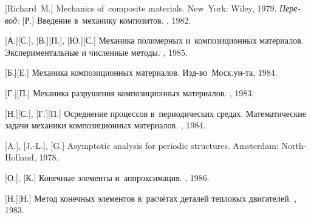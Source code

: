 \begin{thebibliography}{123}
\begin{otherlanguage}{russian}
[Richard~M.] Mechanics of~composite materials. New~York: Wiley, 1979. 
\emph{Перевод:} [Р.] Введение в~механику композитов. \mirpublisher, 1982. 

[А.][С.], [В.][П.], [Ю.][С.] Механика полимерных и~композиционных материалов. Экспериментальные и численные методы. \naukapublisher, 1985. 

[Б.][Е.] Механика композиционных материалов. Изд\hbox{-}во~Моск.\:ун\hbox{-}та, 1984. 

[Г.][П.] Механика разрушения композиционных материалов. \naukapublisher, 1983. 

[Н.][С.], [Г.][П.] Осреднение процессов в~периодических средах. Математические задачи механики композиционных материалов. \naukapublisher, 1984. 

[A.], %
[J.-L.], %
[G.]
Asymptotic analysis for periodic structures. Amsterdam: North\hbox{-}Holland, 1978. 

%
%



[О.], [К.] Конечные элементы и~аппроксимация. \mirpublisher, 1986. 

[Н.][Н.] Метод конечных элементов в~расчётах деталей тепловых двигателей. \maschinenbauleningraderverlag, 1983. 


\end{otherlanguage}
\end{thebibliography}
